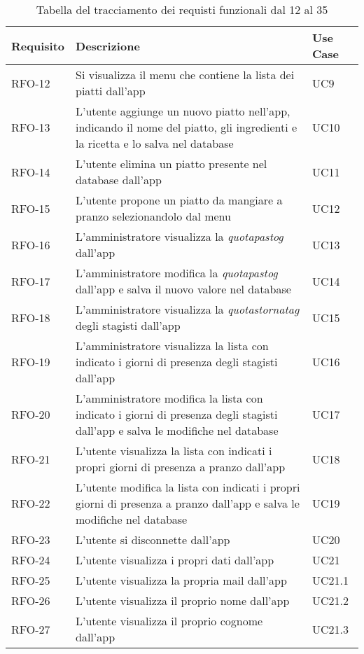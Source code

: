 \begin{table}%
\caption{Tabella del tracciamento dei requisti funzionali dal 12 al 35}
\begin{tabularx}{\textwidth}{lXl}
\hline
\textbf{Requisito} & \textbf{Descrizione} & \textbf{Use Case}\\
\hline\hline
RFO-12    & Si visualizza il menu che contiene la lista dei piatti dall'app & UC9 \\
\hline
RFO-13    & L'utente aggiunge un nuovo piatto nell'app, indicando il nome del piatto, gli ingredienti e la ricetta e lo salva nel database & UC10 \\
\hline
RFO-14    & L'utente elimina un piatto presente nel database dall'app & UC11 \\
\hline
RFO-15    & L'utente propone un piatto da mangiare a pranzo selezionandolo dal menu & UC12 \\
\hline
RFO-16    & L'amministratore visualizza la \emph{\gls{quotapastog}} dall'app & UC13 \\
\hline
RFO-17    & L'amministratore modifica la \emph{\gls{quotapastog}} dall'app e salva il nuovo valore nel database & UC14 \\
\hline
RFO-18    & L'amministratore visualizza la \emph{\gls{quotastornatag}} degli stagisti dall'app & UC15 \\
\hline
RFO-19    & L'amministratore visualizza la lista con indicato i giorni di presenza degli stagisti dall'app & UC16 \\
\hline
RFO-20    & L'amministratore modifica la lista con indicato i giorni di presenza degli stagisti dall'app e salva le modifiche nel database & UC17 \\
\hline
RFO-21    & L'utente visualizza la lista con indicati i propri giorni di presenza a pranzo dall'app & UC18 \\
\hline
RFO-22    & L'utente modifica la lista con indicati i propri giorni di presenza a pranzo dall'app e salva le modifiche nel database & UC19 \\
\hline
RFO-23    & L'utente si disconnette dall'app & UC20 \\
\hline
RFO-24    & L'utente visualizza i propri dati dall'app & UC21 \\
\hline
RFO-25    & L'utente visualizza la propria mail dall'app & UC21.1 \\
\hline
RFO-26    & L'utente visualizza il proprio nome dall'app & UC21.2 \\
\hline
RFO-27    & L'utente visualizza il proprio cognome dall'app & UC21.3 \\

\end{tabularx}
\end{table}
